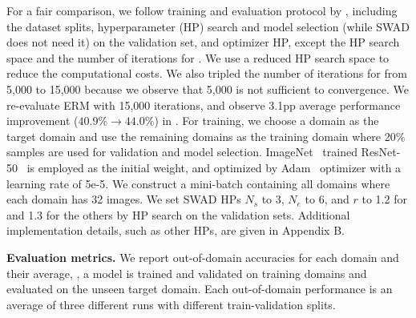 

For a fair comparison, we follow training and evaluation protocol by \citet{gulrajani2020domainbed}, including the dataset splits, hyperparameter (HP) search and model selection (while SWAD does not need it) on the validation set, and optimizer HP, except the HP search space and the number of iterations for .
We use a reduced HP search space to reduce the computational costs.
We also tripled the number of iterations for  from 5,000 to 15,000 because we observe that 5,000 is not sufficient to convergence. We re-evaluate ERM with 15,000 iterations, and observe 3.1pp average performance improvement ($40.9\% \rightarrow 44.0\%$) in .
For training, we choose a domain as the target domain and use the remaining domains as the training domain where 20\% samples are used for validation and model selection.
ImageNet~\cite{russakovsky2015imagenet} trained ResNet-50~\cite{he2016_cvpr_resnet} is employed as the initial weight, and optimized by Adam~\cite{kingma2015adam} optimizer with a learning rate of 5e-5. We construct a mini-batch containing all domains where each domain has 32 images.
We set SWAD HPs $N_s$ to 3, $N_e$ to 6, and $r$ to 1.2 for  and 1.3 for the others by HP search on the validation sets.
Additional implementation details, such as other HPs, are given in Appendix B.

\textbf{Evaluation metrics.}
We report out-of-domain accuracies for each domain and their average, \ie, a model is trained and validated on training domains and evaluated on the unseen target domain. Each out-of-domain performance is an average of three different runs with different train-validation splits.

